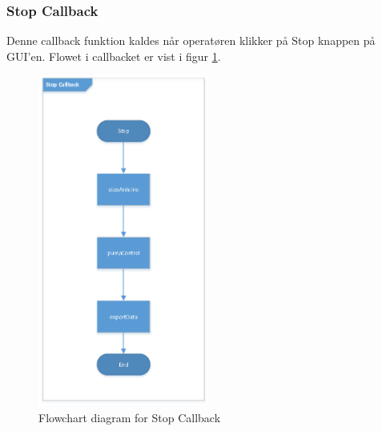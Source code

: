 \subsubsection{Stop Callback}
Denne callback funktion kaldes når operatøren klikker på Stop knappen på GUI'en. Flowet i callbacket er vist i figur \ref{fig:act_stop}.
\begin{figure}[H]
	\centering
	\includegraphics[width=0.5\textwidth]{billeder/act_stop-crop.pdf}
	\caption{Flowchart diagram for Stop Callback}
	\label{fig:act_stop}
\end{figure}

\newpage
